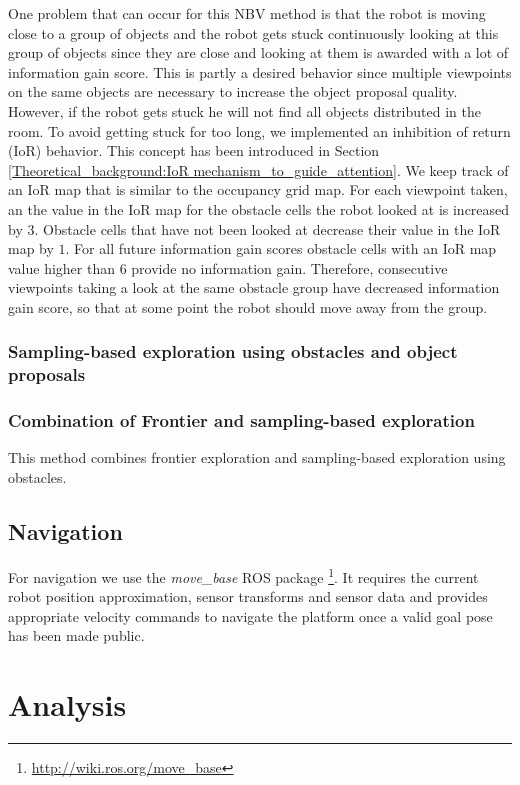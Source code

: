 \documentclass[a4paper,11pt,english]{article}
\begin{document}
One problem that can occur for this NBV method is that the robot is moving close to a group of objects and the robot gets stuck continuously looking at this group of objects since they are close and looking at them is awarded with a lot of information gain score.
This is partly a desired behavior since multiple viewpoints on the same objects are necessary to increase the object proposal quality. However, if the robot gets stuck he will not find all objects distributed in the room.
To avoid getting stuck for too long, we implemented an inhibition of return (IoR) behavior. This concept has been introduced in Section \ref{Theoretical_background:IoR mechanism_to_guide_attention}.
We keep track of an IoR map that is similar to the occupancy grid map.
For each viewpoint taken, an the value in the IoR map for the obstacle cells the robot looked at is increased by $3$.
Obstacle cells that have not been looked at decrease their value in the IoR map by $1$.
For all future information gain scores obstacle cells with an IoR map value higher than $6$ provide no information gain.
Therefore, consecutive viewpoints taking a look at the same obstacle group have decreased information gain score, so that at some point the robot should move away from the group.

\subsubsection{Sampling-based exploration using obstacles and object proposals}
\subsubsection{Combination of Frontier and sampling-based exploration}
This method combines frontier exploration and sampling-based exploration using obstacles.


\subsection{Navigation}
For navigation we use the \textit{move\_base} ROS package \footnote{\url{http://wiki.ros.org/move_base}}.
It requires the current robot position approximation, sensor transforms and sensor data and provides appropriate velocity commands to navigate the platform once a valid goal pose has been made public.

\section{Analysis}
\label{Analysis}
\end{document}
